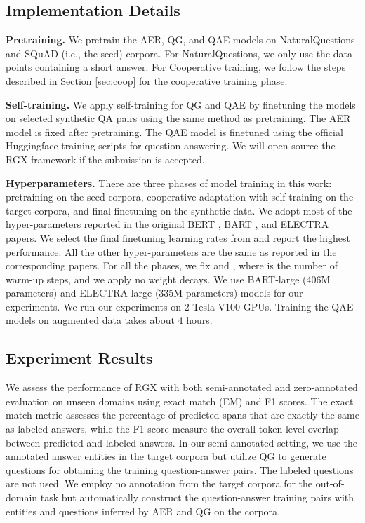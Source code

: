 \documentclass[11pt,a4paper]{article}
\begin{document}
\subsection{Implementation Details}


\noindent \textbf{Pretraining.}
We pretrain the AER, QG, and QAE models on NaturalQuestions and SQuAD (i.e., the seed) corpora. For NaturalQuestions, we only use the data points containing a short answer. For Cooperative training, we follow the steps described in Section \ref{sec:coop} for the cooperative training phase. 



\noindent \textbf{Self-training.}
We apply self-training for QG and QAE by finetuning the models on selected synthetic QA pairs using the same method as pretraining. The AER model is fixed after pretraining. The QAE model is finetuned using the official Huggingface \cite{wolf2019huggingface} training scripts for question answering. We will open-source the RGX framework if the submission is accepted. 

\noindent \textbf{Hyperparameters.} There are three phases of model training in this work: pretraining on the seed corpora, cooperative adaptation with self-training on the target corpora, and final finetuning on the synthetic data. We adopt most of the hyper-parameters reported in the original BERT \cite{devlin2018bert}, BART \cite{lewis2019bart}, and ELECTRA \cite{clark2019electra} papers.
We select the final finetuning learning rates from  and report the highest performance. All the other hyper-parameters are the same as reported in the corresponding papers. For all the phases, we fix  and , where  is the number of warm-up steps, and we apply no weight decays. We use BART-large (406M parameters) and ELECTRA-large (335M parameters) models for our experiments. We run our experiments on 2 Tesla V100 GPUs. Training the QAE models on augmented data takes about 4 hours.

\subsection{Experiment Results}
We assess the performance of RGX with both semi-annotated and zero-annotated evaluation on unseen domains using exact match (EM) and F1 scores. The exact match metric assesses the percentage of predicted spans that are exactly the same as labeled answers, while the F1 score measure the overall token-level overlap between predicted and labeled answers. In our semi-annotated setting, we use the annotated answer entities in the target corpora but utilize QG to generate questions for obtaining the training question-answer pairs. The labeled questions are not used. We employ no annotation from the target corpora for the out-of-domain task but automatically construct the question-answer training pairs with entities and questions inferred by AER and QG on the corpora.
\end{document}
